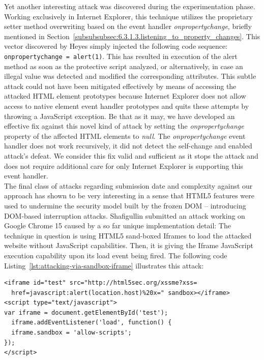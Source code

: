       Yet another interesting attack was discovered during the experimentation phase. Working exclusively in Internet Explorer, this technique utilizes the proprietary setter method overwriting based on the event handler \textit{onpropertychange}, briefly mentioned in Section~\ref{subsubsubsec:6.3.1.3.listening_to_property_changes}. This vector discovered by Heyes simply injected the following code sequence: \texttt{onpropertychange = alert(1)}. This has resulted in execution of the alert method as soon as the protective script analyzed, or alternatively, in case an illegal value was detected and modified the corresponding attributes. This subtle attack could not have been mitigated effectively by means of accessing the attacked HTML element prototypes because Internet Explorer does not allow access to native element event handler prototypes and quits these attempts by throwing a JavaScript exception. Be that as it may, we have developed an effective fix against this novel kind of attack by setting the \textit{onpropertychange} property of the affected HTML elements to \textit{null}. The \textit{onpropertychange} event handler does not work recursively, it did not detect the self-change and enabled attack's defeat. We consider this fix valid and sufficient as it stops the attack and does not require additional care for only Internet Explorer is supporting this event handler. \\

      The final class of attacks regarding submission date and complexity against our approach has shown to be very interesting in a sense that HTML5 features were used to undermine the security model built by the frozen DOM -- introducing DOM-based interruption attacks. Shafigullin submitted an attack working on Google Chrome 15 caused by a so far unique implementation detail: The technique in question is using HTML5 sand-boxed Iframes to load the attacked website without JavaScript capabilities. Then, it is giving the Iframe JavaScript execution capability upon its load event being fired. The following code Listing~\ref{lst:attacking-via-sandbox-iframe} illustrates this attack:

\begin{lstlisting}[captionpos=b,label=lst:attacking-via-sandbox-iframe,caption=Sourcecode for the event control breaker challenge submitted by R. Shafigullin]
<iframe id="test" src="http://html5sec.org/xssme?xss= 
  href=javascript:alert(location.host)%20x=" sandbox></iframe>
<script type="text/javascript">
var iframe = document.getElementById('test');
  iframe.addEventListener('load', function() {
  iframe.sandbox = 'allow-scripts';
});
</script>
\end{lstlisting}

